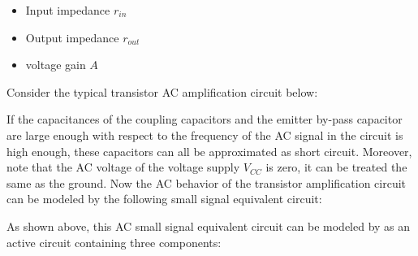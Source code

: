 \documentclass{article}
\begin{document}
\begin{itemize}
\item Input impedance $r_{in}$
\item Output impedance $r_{out}$ 
\item voltage gain $A$
\end{itemize}

Consider the typical transistor AC amplification circuit below:


If the capacitances of the coupling capacitors and the emitter by-pass 
capacitor are large enough with respect to the frequency of the AC signal 
in the circuit is high enough, these capacitors can all be approximated as 
short circuit. Moreover, note that the AC voltage of the voltage supply
$V_{CC}$ is zero, it can be treated the same as the ground. Now the AC
behavior of the transistor amplification circuit can be modeled by the 
following small signal equivalent circuit:



As shown above, this AC small signal equivalent circuit can be modeled 
by as an active circuit containing three components:
\end{document}
